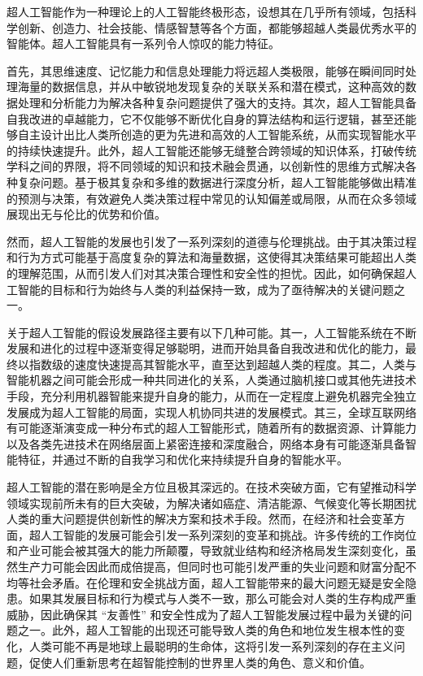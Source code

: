超人工智能作为一种理论上的人工智能终极形态，设想其在几乎所有领域，包括科学创新、创造力、社会技能、情感智慧等各个方面，都能够超越人类最优秀水平的智能体。超人工智能具有一系列令人惊叹的能力特征。


首先，其思维速度、记忆能力和信息处理能力将远超人类极限，能够在瞬间同时处理海量的数据信息，并从中敏锐地发现复杂的关联关系和潜在模式，这种高效的数据处理和分析能力为解决各种复杂问题提供了强大的支持。其次，超人工智能具备自我改进的卓越能力，它不仅能够不断优化自身的算法结构和运行逻辑，甚至还能够自主设计出比人类所创造的更为先进和高效的人工智能系统，从而实现智能水平的持续快速提升。此外，超人工智能还能够无缝整合跨领域的知识体系，打破传统学科之间的界限，将不同领域的知识和技术融会贯通，以创新性的思维方式解决各种复杂问题。基于极其复杂和多维的数据进行深度分析，超人工智能能够做出精准的预测与决策，有效避免人类决策过程中常见的认知偏差或局限，从而在众多领域展现出无与伦比的优势和价值。


然而，超人工智能的发展也引发了一系列深刻的道德与伦理挑战。由于其决策过程和行为方式可能基于高度复杂的算法和海量数据，这使得其决策结果可能超出人类的理解范围，从而引发人们对其决策合理性和安全性的担忧。因此，如何确保超人工智能的目标和行为始终与人类的利益保持一致，成为了亟待解决的关键问题之一。


关于超人工智能的假设发展路径主要有以下几种可能。其一，人工智能系统在不断发展和进化的过程中逐渐变得足够聪明，进而开始具备自我改进和优化的能力，最终以指数级的速度快速提高其智能水平，直至达到超越人类的程度。其二，人类与智能机器之间可能会形成一种共同进化的关系，人类通过脑机接口或其他先进技术手段，充分利用机器智能来提升自身的能力，从而在一定程度上避免机器完全独立发展成为超人工智能的局面，实现人机协同共进的发展模式。其三，全球互联网络有可能逐渐演变成一种分布式的超人工智能形式，随着所有的数据资源、计算能力以及各类先进技术在网络层面上紧密连接和深度融合，网络本身有可能逐渐具备智能特征，并通过不断的自我学习和优化来持续提升自身的智能水平。


超人工智能的潜在影响是全方位且极其深远的。在技术突破方面，它有望推动科学领域实现前所未有的巨大突破，为解决诸如癌症、清洁能源、气候变化等长期困扰人类的重大问题提供创新性的解决方案和技术手段。然而，在经济和社会变革方面，超人工智能的发展可能会引发一系列深刻的变革和挑战。许多传统的工作岗位和产业可能会被其强大的能力所颠覆，导致就业结构和经济格局发生深刻变化，虽然生产力可能会因此而成倍提高，但同时也可能引发严重的失业问题和财富分配不均等社会矛盾。在伦理和安全挑战方面，超人工智能带来的最大问题无疑是安全隐患。如果其发展目标和行为模式与人类不一致，那么可能会对人类的生存构成严重威胁，因此确保其 “友善性” 和安全性成为了超人工智能发展过程中最为关键的问题之一。此外，超人工智能的出现还可能导致人类的角色和地位发生根本性的变化，人类可能不再是地球上最聪明的生命体，这将引发一系列深刻的存在主义问题，促使人们重新思考在超智能控制的世界里人类的角色、意义和价值。


